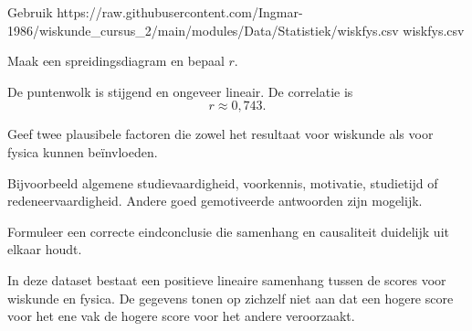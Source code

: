 \documentclass{ximera}
\begin{document}
\begin{oefening}{\oefU \ESS}

Gebruik \csv
{https://raw.githubusercontent.com/Ingmar-1986/wiskunde_cursus_2/main/modules/Data/Statistiek/wiskfys.csv}
{wiskfys.csv}

\begin{question}
Maak een spreidingsdiagram en bepaal $r$.

\begin{oplossing}
De puntenwolk is stijgend en ongeveer lineair. De correlatie is
\[
r\approx0{,}743.
\]
\end{oplossing}
\end{question}

\begin{question}
Geef twee plausibele factoren die zowel het resultaat voor wiskunde
als voor fysica kunnen beïnvloeden.

\begin{oplossing}
Bijvoorbeeld algemene studievaardigheid, voorkennis, motivatie,
studietijd of redeneervaardigheid. Andere goed gemotiveerde antwoorden
zijn mogelijk.
\end{oplossing}
\end{question}

\begin{question}
Formuleer een correcte eindconclusie die samenhang en causaliteit
duidelijk uit elkaar houdt.

\begin{oplossing}
In deze dataset bestaat een positieve lineaire samenhang tussen de
scores voor wiskunde en fysica. De gegevens tonen op zichzelf niet aan
dat een hogere score voor het ene vak de hogere score voor het andere
veroorzaakt.
\end{oplossing}
\end{question}

\end{oefening}
\end{document}

